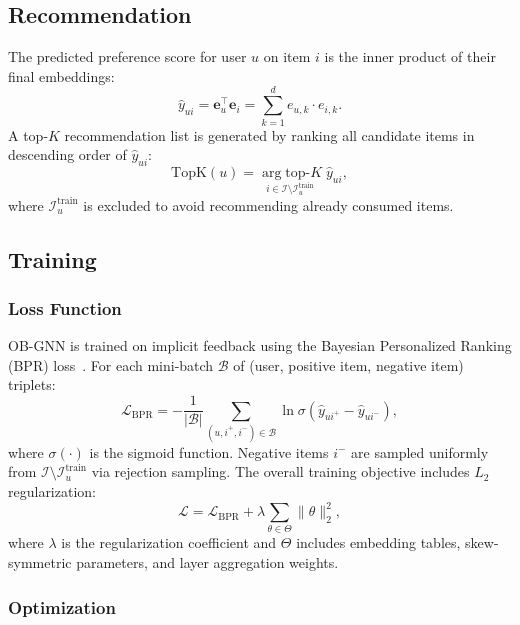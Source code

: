 \subsection{Recommendation}

The predicted preference score for user $u$ on item $i$ is the inner product of their final embeddings:
\begin{equation}
    \hat{y}_{ui} = \mathbf{e}_u^\top \mathbf{e}_i = \sum_{k=1}^{d} e_{u,k} \cdot e_{i,k}.
\end{equation}
A top-$K$ recommendation list is generated by ranking all candidate items in descending order of $\hat{y}_{ui}$:
\begin{equation}
    \text{TopK}(u) = \underset{i \in \mathcal{I} \setminus \mathcal{I}_u^{\text{train}}}{\arg\text{top-}K} \; \hat{y}_{ui},
\end{equation}
where $\mathcal{I}_u^{\text{train}}$ is excluded to avoid recommending already consumed items.


\subsection{Training}

\subsubsection{Loss Function}

OB-GNN is trained on implicit feedback using the Bayesian Personalized Ranking (BPR) loss~\cite{rendle2009bpr}. For each mini-batch $\mathcal{B}$ of (user, positive item, negative item) triplets:
\begin{equation}
    \mathcal{L}_{\text{BPR}} = - \frac{1}{|\mathcal{B}|} \sum_{(u, i^+, i^-) \in \mathcal{B}} \ln \sigma\!\left(\hat{y}_{ui^+} - \hat{y}_{ui^-}\right),
\end{equation}
where $\sigma(\cdot)$ is the sigmoid function. Negative items $i^-$ are sampled uniformly from $\mathcal{I} \setminus \mathcal{I}_u^{\text{train}}$ via rejection sampling. The overall training objective includes $L_2$ regularization:
\begin{equation}
    \mathcal{L} = \mathcal{L}_{\text{BPR}} + \lambda \sum_{\theta \in \Theta} \|\theta\|_2^2,
\end{equation}
where $\lambda$ is the regularization coefficient and $\Theta$ includes embedding tables, skew-symmetric parameters, and layer aggregation weights.


\subsubsection{Optimization}


